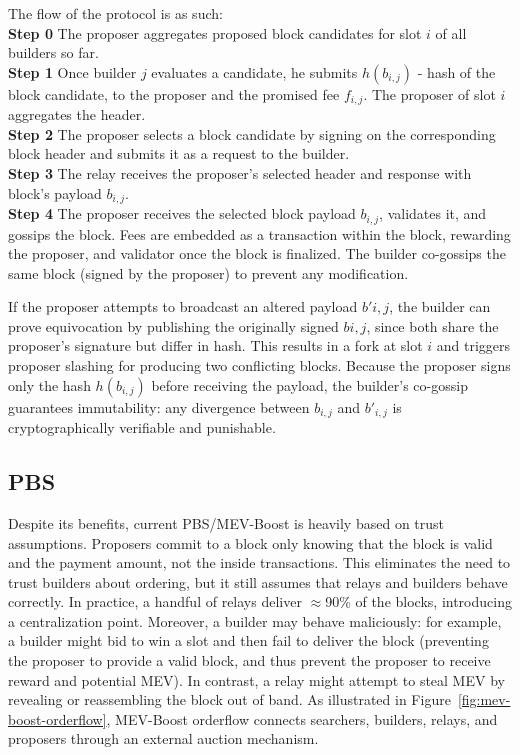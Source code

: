The flow of the protocol is as such:
\\[8pt]
\noindent\textbf{Step 0} The proposer aggregates proposed block candidates for slot $i$ of all builders so far.
\\[8pt]
\noindent\textbf{Step 1} Once builder $j$ evaluates a candidate, he submits $h(b_{i,j})$ - hash of the block candidate, to the proposer and the promised fee $f_{i,j}$. The proposer of slot $i$ aggregates the header.
\\[8pt]
\noindent\textbf{Step 2} The proposer selects a block candidate by signing on the corresponding block header and submits it as a request to the builder. 
\\[8pt]
\noindent\textbf{Step 3} The relay receives the proposer's selected header and response with block's payload $b_{i,j}$.
\\[8pt]

\noindent\textbf{Step 4} The proposer receives the selected block payload $b_{i,j}$, validates it, and gossips the block.
Fees are embedded as a transaction within the block, rewarding the proposer, and validator once the block is finalized.
The builder co-gossips the same block (signed by the proposer) to prevent any modification.

If the proposer attempts to broadcast an altered payload $b'{i,j}$, the builder can prove equivocation by publishing the originally signed $b{i,j}$, since both share the proposer’s signature but differ in hash.
This results in a fork at slot $i$ and triggers proposer slashing for producing two conflicting blocks.
Because the proposer signs only the hash $h(b_{i,j})$ before receiving the payload, the builder’s co-gossip guarantees immutability: any divergence between $b_{i,j}$ and $b'_{i,j}$ is cryptographically verifiable and punishable.


\subsection{PBS}
Despite its benefits, current PBS/MEV-Boost is heavily based on trust assumptions. Proposers commit to a block only knowing that the block is valid and the payment amount, not the inside transactions. This eliminates the need to trust builders about ordering, but it still assumes that relays and builders behave correctly.  In practice, a handful of relays deliver $\approx$90\% of the blocks, introducing a centralization point. Moreover, a builder may behave maliciously: for example, a builder might bid to win a slot and then fail to deliver the block (preventing the proposer to provide a valid block, and thus prevent the proposer to receive reward and potential MEV).  In contrast, a relay might attempt to steal MEV by revealing or reassembling the block out of band. As illustrated in Figure~\ref{fig:mev-boost-orderflow}, MEV-Boost orderflow connects searchers, builders, relays, and proposers through an external auction mechanism.

